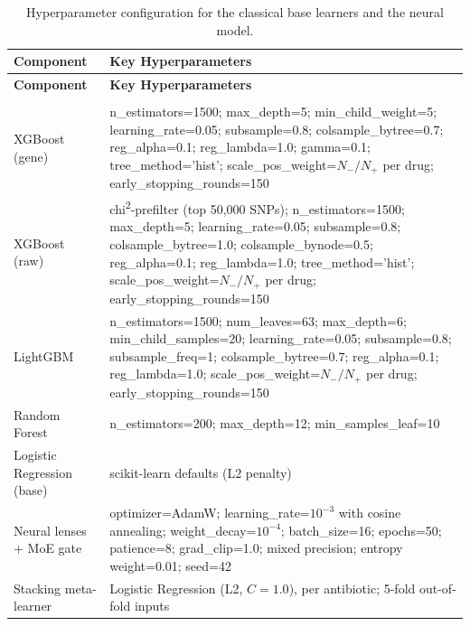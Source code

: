 {\small\setlength{\tabcolsep}{5pt}
\begin{longtable}{|>{\raggedright\arraybackslash}p{2.9cm}|>{\raggedright\arraybackslash}p{10.7cm}|}
\caption{Hyperparameter configuration for the classical base learners and the neural model.}
\label{tab:hyperparameters}\\
\hline
\textbf{Component} & \textbf{Key Hyperparameters} \\
\hline
\endfirsthead
\hline
\textbf{Component} & \textbf{Key Hyperparameters} \\
\hline
\endhead
\hline
\multicolumn{2}{r}{\footnotesize\textit{Continued on the next page}}\\
\endfoot
\hline
\endlastfoot
XGBoost (gene) &
n\_estimators=1500; max\_depth=5; min\_child\_weight=5; learning\_rate=0.05;
subsample=0.8; colsample\_bytree=0.7; reg\_alpha=0.1; reg\_lambda=1.0; gamma=0.1;
tree\_method='hist'; scale\_pos\_weight=$N_-/N_+$ per drug; early\_stopping\_rounds=150 \\ \hline
XGBoost (raw) &
chi\textsuperscript{2}-prefilter (top 50{,}000 SNPs); n\_estimators=1500; max\_depth=5;
learning\_rate=0.05; subsample=0.8; colsample\_bytree=1.0; colsample\_bynode=0.5;
reg\_alpha=0.1; reg\_lambda=1.0; tree\_method='hist'; scale\_pos\_weight=$N_-/N_+$ per drug;
early\_stopping\_rounds=150 \\ \hline
LightGBM &
n\_estimators=1500; num\_leaves=63; max\_depth=6; min\_child\_samples=20; learning\_rate=0.05;
subsample=0.8; subsample\_freq=1; colsample\_bytree=0.7; reg\_alpha=0.1;
reg\_lambda=1.0; scale\_pos\_weight=$N_-/N_+$ per drug; early\_stopping\_rounds=150 \\ \hline
Random Forest &
n\_estimators=200; max\_depth=12; min\_samples\_leaf=10 \\ \hline
Logistic Regression (base) &
scikit-learn defaults (L2 penalty) \\ \hline
Neural lenses + MoE gate &
optimizer=AdamW; learning\_rate=$10^{-3}$ with cosine annealing;
weight\_decay=$10^{-4}$; batch\_size=16;
epochs=50; patience=8; grad\_clip=1.0; mixed precision; entropy weight=0.01; seed=42 \\ \hline
Stacking meta-learner &
Logistic Regression (L2, $C=1.0$), per antibiotic; 5-fold out-of-fold inputs \\ \hline
\end{longtable}}